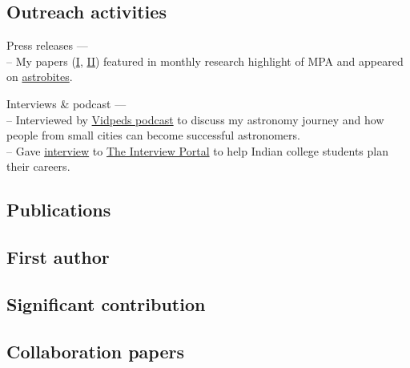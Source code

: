 \documentclass[12pt,letterpaper]{article}
\begin{document}
\subsection{Outreach activities}
\begin{list}{}{\cvlist}
    \item Press releases --- \\
        -- My papers (\href{https://www.mpa-garching.mpg.de/964620/hl202107}{I}, \href{https://www.mpa-garching.mpg.de/1066558/hl202211?c=27981}{II}) featured in monthly research highlight of MPA and appeared on \href{https://astrobites.org/2021/05/06/cool-metal-gas-search-thanks-it-was-automated/}{astrobites}.
    \item Interviews \& podcast --- \\
      -- Interviewed by \href{https://www.youtube.com/watch?v=WmA_PnYLeCg}{Vidpeds podcast} to discuss my astronomy journey and how people from small cities can become successful astronomers. \\
      -- Gave \href{https://theinterviewportal.com/2020/03/13/astrophysicist-interview-8/}{interview} to \href{https://theinterviewportal.com/}{The Interview Portal} to help Indian college students plan their careers.
  \end{list}

\ifdefined\withpubs
  \subsection{Publications}
  

  \subsection*{First author}
\begin{list}{}{\cvlist}

\end{list}

\subsection*{Significant contribution}

\begin{list}{}{\cvlist}

\end{list}

\subsection*{Collaboration papers}

\begin{list}{}{\cvlist}

\end{list}

%  

%  
\fi
\end{document}
